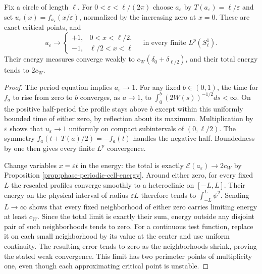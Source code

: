 \begin{example}\label{ex:phase-circle-two-interface-limit}
Fix a circle of length $\ell$. For $0<\varepsilon<\ell/(2\pi)$ choose $a_\varepsilon$ by $T(a_\varepsilon)=\ell/\varepsilon$ and set
$u_\varepsilon(x)=f_{a_\varepsilon}(x/\varepsilon)$, normalized by the increasing zero at $x=0$. These are exact critical points, and
\[
 u_\varepsilon\longrightarrow
 \begin{cases}
 +1,&0<x<\ell/2,\\
 -1,&\ell/2<x<\ell
 \end{cases}
 \quad\text{in every finite }L^p(S^1_\ell).
\]
Their energy measures converge weakly to
$c_W(\delta_0+\delta_{\ell/2})$, and their total energy tends to $2c_W$.
\end{example}
\begin{proof}
The period equation implies $a_\varepsilon\to1$. For any fixed $b\in(0,1)$, the time for $f_a$ to rise from zero to $b$ converges, as $a\to1$, to
$\int_0^b(2W(s))^{-1/2}ds<\infty$. On the positive half-period the profile stays above $b$ except within this uniformly bounded time of either zero, by reflection about its maximum. Multiplication by $\varepsilon$ shows that $u_\varepsilon\to1$ uniformly on compact subintervals of $(0,\ell/2)$. The symmetry $f_a(t+T(a)/2)=-f_a(t)$ handles the negative half. Boundedness by one then gives every finite $L^p$ convergence.

Change variables $x=\varepsilon t$ in the energy: the total is exactly $\mathcal E(a_\varepsilon)\to2c_W$ by Proposition \ref{prop:phase-periodic-cell-energy}. Around either zero, for every fixed $L$ the rescaled profiles converge smoothly to a heteroclinic on $[-L,L]$. Their energy on the physical interval of radius $\varepsilon L$ therefore tends to $\int_{-L}^L\psi^2$. Sending $L\to\infty$ shows that every fixed neighborhood of either zero carries limiting energy at least $c_W$. Since the total limit is exactly their sum, energy outside any disjoint pair of such neighborhoods tends to zero. For a continuous test function, replace it on each small neighborhood by its value at the center and use uniform continuity. The resulting error tends to zero as the neighborhoods shrink, proving the stated weak convergence. This limit has two perimeter points of multiplicity one, even though each approximating critical point is unstable.
\end{proof}
